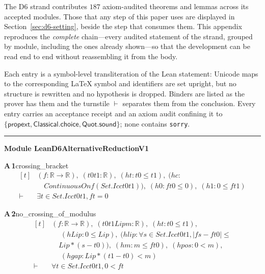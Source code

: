 \documentclass[conference]{IEEEtran}
\theoremstyle{definition}
\newcommand{\lean}[1]{\textsf{\footnotesize #1}}
\begin{document}
The D6 strand contributes $187$ axiom-audited theorems and lemmas across its accepted modules. Those that any step of this paper uses are displayed in Section~\ref{sec:d6-setting}, beside the step that consumes them. This appendix reproduces the \emph{complete} chain---every audited statement of the strand, grouped by module, including the ones already shown---so that the development can be read end to end without reassembling it from the body.

Each entry is a symbol-level transliteration of the Lean statement: Unicode maps to the corresponding \LaTeX{} symbol and identifiers are set upright, but no structure is rewritten and no hypothesis is dropped. Binders are listed as the prover has them and the turnstile $\vdash$ separates them from the conclusion. Every entry carries an acceptance receipt and an axiom audit confining it to $\{\textsf{propext},\textsf{Classical.choice},\textsf{Quot.sound}\}$; none contains \texttt{sorry}.

\vspace{4pt}\noindent\rule{\columnwidth}{0.4pt}\par\vspace{2pt}
\noindent\textbf{Module \lean{LeanD6AlternativeReductionV1}}\par\vspace{3pt}

\noindent\textbf{A\,1}\quad\lean{crossing\_bracket}
{\footnotesize\[ \begin{aligned}[t]
&(\mathit{f} : \mathbb{R} \to \mathbb{R} ),\; (\mathit{t0} \mathit{t1} : \mathbb{R} ),\; (\mathit{ht} : \mathit{t0} \leq \mathit{t1}),\; (\mathit{hc} :\\
&\quad \mathit{ContinuousOn} \mathit{f} (\mathit{Set}.\mathit{Icc} \mathit{t0} \mathit{t1})),\; (\mathit{h0} : \mathit{f} \mathit{t0} \leq 0),\; (\mathit{h1} : 0 \leq \mathit{f} \mathit{t1})\\
\vdash\;&\exists \mathit{t} \in \mathit{Set}.\mathit{Icc} \mathit{t0} \mathit{t1}, \mathit{f} \mathit{t} = 0
\end{aligned} \]}

\noindent\textbf{A\,2}\quad\lean{no\_crossing\_of\_modulus}
{\footnotesize\[ \begin{aligned}[t]
&(\mathit{f} : \mathbb{R} \to \mathbb{R} ),\; (\mathit{t0} \mathit{t1} \mathit{Lip} \mathit{m} : \mathbb{R} ),\; (\mathit{ht} : \mathit{t0} \leq \mathit{t1}),\\
&\quad \; (\mathit{hLip} : 0 \leq \mathit{Lip}),\; (\mathit{hlip} : \forall \mathit{s} \in \mathit{Set}.\mathit{Icc} \mathit{t0} \mathit{t1}, |\mathit{f} \mathit{s} - \mathit{f} \mathit{t0}| \leq\\
&\quad \mathit{Lip} * (\mathit{s} - \mathit{t0})),\; (\mathit{hm} : \mathit{m} \leq \mathit{f} \mathit{t0}),\; (\mathit{hpos} : 0 < \mathit{m}),\\
&\quad \; (\mathit{hgap} : \mathit{Lip} * (\mathit{t1} - \mathit{t0}) < \mathit{m})\\
\vdash\;&\forall \mathit{t} \in \mathit{Set}.\mathit{Icc} \mathit{t0} \mathit{t1}, 0 < \mathit{f} \mathit{t}
\end{aligned} \]}
\end{document}
